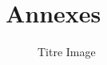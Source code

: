 \section{Annexes}

\begin{figure}
\begin{center}
	\caption{Titre Image}\label{img:labelImg}
\end{center}
\end{figure}